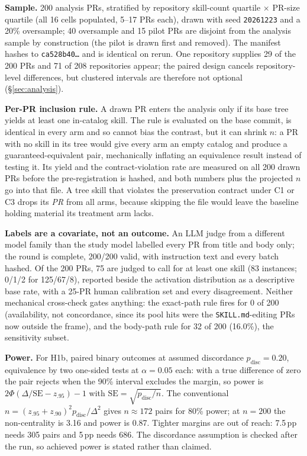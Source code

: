 \documentclass[10pt,conference]{IEEEtran}
\begin{document}
\textbf{Sample.} 200 analysis PRs, stratified by repository skill-count quartile $\times$ PR-size quartile (all 16 cells populated, 5--17 PRs each), drawn with seed \texttt{20261223} and a 20\% oversample; 40 oversample and 15 pilot PRs are disjoint from the analysis sample by construction (the pilot is drawn first and removed). The manifest hashes to \texttt{ca528b40\ldots} and is identical on rerun. One repository supplies 29 of the 200 PRs and 71 of 208 repositories appear; the paired design cancels repository-level differences, but clustered intervals are therefore not optional (\S\ref{sec:analysis}).

\textbf{Per-PR inclusion rule.} A drawn PR enters the analysis only if its base tree yields at least one in-catalog skill. The rule is evaluated on the base commit, is identical in every arm and so cannot bias the contrast, but it can shrink $n$: a PR with no skill in its tree would give every arm an empty catalog and produce a guaranteed-equivalent pair, mechanically inflating an equivalence result instead of testing it. Its yield and the contract-violation rate are measured on all 200 drawn PRs before the pre-registration is hashed, and both numbers plus the projected $n$ go into that file. A tree skill that violates the preservation contract under C1 or C3 drops its \emph{PR} from all arms, because skipping the file would leave the baseline holding material its treatment arm lacks.

\textbf{Labels are a covariate, not an outcome.} An LLM judge from a different model family than the study model labelled every PR from title and body only; the round is complete, 200/200 valid, with instruction text and every batch hashed. Of the 200 PRs, 75 are judged to call for at least one skill (83 instances; 0/1/2 for 125/67/8), reported beside the activation distribution as a descriptive base rate, with a 25-PR human calibration set and every disagreement. Neither mechanical cross-check gates anything: the exact-path rule fires for 0 of 200 (availability, not concordance, since its pool hits were the \texttt{SKILL.md}-editing PRs now outside the frame), and the body-path rule for 32 of 200 (16.0\%), the sensitivity subset.

\textbf{Power.} For H1b, paired binary outcomes at assumed discordance $p_{\mathrm{disc}}=0.20$, equivalence by two one-sided tests at $\alpha=0.05$ each: with a true difference of zero the pair rejects when the 90\% interval excludes the margin, so power is $2\Phi(\Delta/\mathrm{SE}-z_{.95})-1$ with $\mathrm{SE}=\sqrt{p_{\mathrm{disc}}/n}$. The conventional $n=(z_{.95}+z_{.90})^2p_{\mathrm{disc}}/\Delta^2$ gives $n\approx172$ pairs for 80\% power; at $n=200$ the non-centrality is 3.16 and power is 0.87. Tighter margins are out of reach: 7.5\,pp needs 305 pairs and 5\,pp needs 686. The discordance assumption is checked after the run, so achieved power is stated rather than claimed.
\end{document}
